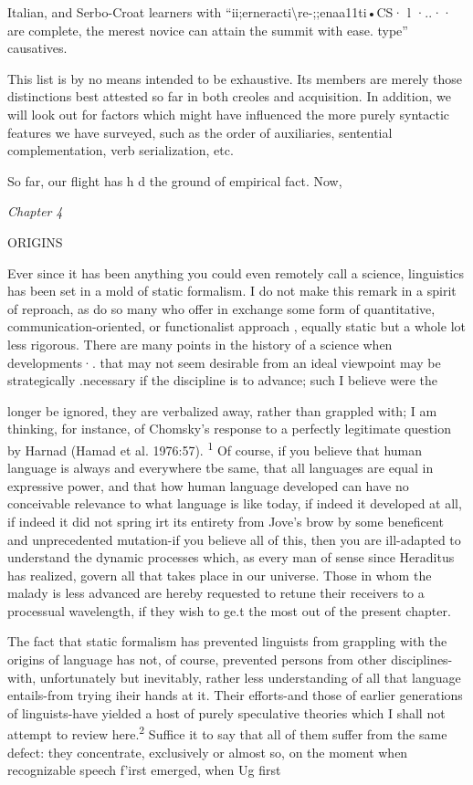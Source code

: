 Italian, and Serbo-Croat learners with ``ii;erneracti{\textbackslash}re-;;enaa11ti•CS· l ·..·· are complete, the merest novice can attain the summit with ease. type'' causatives.

This list is by no means intended to be exhaustive. Its members are merely those distinctions best attested so far in both creoles and acquisition. In addition, we will look out for factors which might have influenced the more purely syntactic features we have surveyed, such as the order of auxiliaries, sentential complementation, verb serialization, etc.

So far, our flight has h d the ground of empirical fact. Now,


\textit{Chapter} \textit{4}

ORIGINS

Ever since it has been anything you could even remotely call a science, linguistics has been set in a mold of static formalism. I do not make this remark in a spirit of reproach, as do so many who offer in exchange some form of quantitative, communication-oriented, or functionalist approach , equally static but a whole lot less rigorous. There are many points in the history of a science when developments·. that may not seem desirable from an ideal viewpoint may be strategi\-cally .necessary if the discipline is to advance; such I believe were the

longer be ignored, they are verbalized away, rather than grappled with; I am thinking, for instance, of Chomsky's response to a perfectly legitimate question by Harnad (Hamad et al. 1976:57). \textsuperscript{1} Of course, if you believe that human language is always and everywhere tbe same, that all languages are equal in expressive power, and that how human language developed can have no conceivable relevance to what language is like today, if indeed it developed at all, if indeed it did not spring irt its entirety from Jove's brow by some beneficent and unprecedented mutation-if you believe all of this, then you are ill-adapted to under\-stand the dynamic processes which, as every man of sense since Hera\-ditus has realized, govern all that takes place in our universe. Those in whom the malady is less advanced are hereby requested to retune their receivers to a processual wavelength, if they wish to ge.t the most out of the present chapter.

The fact that static formalism has prevented linguists from grappling with the origins of language has not, of course, prevented persons from other disciplines-with, unfortunately but inevitably, rather less understanding of all that language entails-from trying iheir hands at it. Their efforts-and those of earlier generations of linguists-have yielded a host of purely speculative theories which I shall not attempt to review here.\textsuperscript{2} Suffice it to say that all of them suffer from the same defect: they concentrate, exclusively or almost so, on the moment when recognizable speech f'irst emerged, when Ug first

